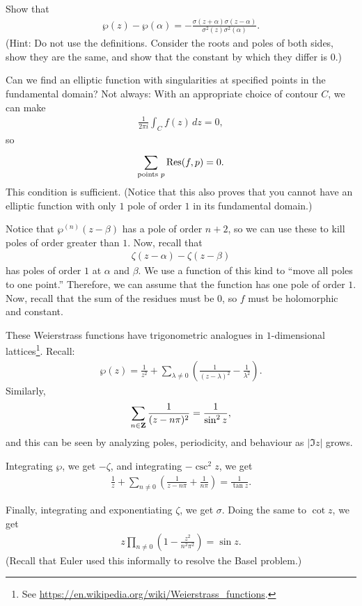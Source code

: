 \documentclass[11pt, oneside,margin=1in]{article}
\begin{document}
\begin{exercise}\label{}\text{}
Show that
\begin{align*}
	\wp(z) - \wp (\alpha) = -  \frac{\sigma(z+\alpha)\sigma (z-\alpha)}{\sigma^2 (z)\sigma^2 (\alpha)}.
\end{align*}
(Hint: Do not use the definitions. Consider the roots and poles of both sides, show they are the same, and show that the constant by which they differ is $0$.)
\end{exercise}

Can we find an elliptic function with singularities at specified points in the fundamental domain? Not always: With an appropriate choice of contour $C$, we can make
\begin{align*}
	\frac{1}{2\pi i} \int_{C}^{} f(z)  \, dz = 0, 
\end{align*}
so 
\begin{align*}
	\sum_{\textrm{points $p$}}^{} \operatorname{Res}(f, p) = 0.
\end{align*}
This condition is sufficient. (Notice that this also proves that you cannot have an elliptic function with only $1$ pole of order $1$ in its fundamental domain.)

Notice that $\wp^{(n)} (z-\beta)$ has a pole of order $n+2$, so we can use these to kill poles of order greater than $1$. Now, recall that
\begin{align*}
	\zeta(z-\alpha) - \zeta (z-\beta)
\end{align*}
has poles of order $1$ at $\alpha$ and $\beta$. We use a function of this kind to ``move all poles to one point.'' Therefore, we can assume that the function has one pole of order $1$. Now, recall that the sum of the residues must be $0$, so $f$ must be holomorphic and constant.

These Weierstrass functions have trigonometric analogues in $1$-dimensional lattices\footnote{See \url{https://en.wikipedia.org/wiki/Weierstrass_functions}.}. Recall:
\begin{align*}
	\wp(z) =  \frac{1}{z^2} + \sum_{\lambda\ne 0}^{} \left( \frac{1}{(z-\lambda) ^2} - \frac{1}{\lambda^2} \right). 
\end{align*}
Similarly,
\begin{align*}
	\sum_{n\in\mathbf Z}^{} \frac{1}{(z-n\pi)^2} = \frac{1}{\sin^2z},
\end{align*}
and this can be seen by analyzing poles, periodicity, and behaviour as $\left\lvert \Im z \right\rvert$ grows. 

Integrating $\wp$, we get $-\zeta$, and integrating $-\csc^2z$, we get
\begin{align*}
	\frac{1}{z}+\sum_{n\ne 0}^{} \left( \frac{1}{z-n\pi}+ \frac{1}{n\pi} \right) = \frac{1}{\tan z}.
\end{align*}

Finally, integrating and exponentiating $\zeta$, we get $\sigma$. Doing the same to $\cot z$, we get
\begin{align*}
	z\prod_{n\ne 0} \left( 1-\frac{z^2}{n^2\pi^2} \right) = \sin z.
\end{align*}
(Recall that Euler used this informally to resolve the Basel problem.)
\printindex
\end{document}
